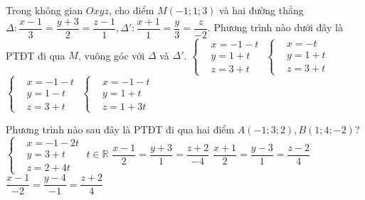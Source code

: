 \begin{ex}%
	Trong không gian $Oxyz$, cho điểm $M(-1;1;3)$ và hai đường thẳng $\Delta\colon\dfrac{x-1}{3}=\dfrac{y+3}{2}=\dfrac{z-1}{1}, \Delta '\colon\dfrac{x+1}{1}=\dfrac{y}{3}=\dfrac{z}{-2}$. Phương trình nào dưới đây là PTĐT đi qua $M$, vuông góc với $\Delta $ và $\Delta '$. 
	\choice
	{\True $\left\{\begin{aligned}& x=-1-t \\
	& y=1+t \\
	& z=3+t 
	\end{aligned}\right.$	}
	{$\left\{\begin{aligned}& x=-t \\
	& y=1+t \\
	& z=3+t 
	\end{aligned}\right.$	}
	{$\left\{\begin{aligned}& x=-1-t \\
	& y=1-t \\
	& z=3+t 
	\end{aligned}\right.$	}
	{$\left\{\begin{aligned}& x=-1-t \\
	& y=1+t \\
	& z=1+3t 
	\end{aligned}\right.$}
\end{ex}
\begin{ex}%
	Phương trình nào sau đây là PTĐT đi qua hai điểm $A\left({-1;3;2}\right),B\left({1;4;-2}\right)$?
	\choice
	{$\left\{\begin{aligned}& x=-1-2t \\& y=3+t \\& z=2+4t 
	\end{aligned}\right. \,\, t\in \mathbb{R}$
	}
	{$\dfrac{x-1}{2}=\dfrac{y+3}{1}=\dfrac{z+2}{-4}$}
	{$\dfrac{x+1}{2}=\dfrac{y-3}{1}=\dfrac{z-2}{4}$}
	{\True $\dfrac{x-1}{-2}=\dfrac{y-4}{-1}=\dfrac{z+2}{4}$}
\end{ex}

